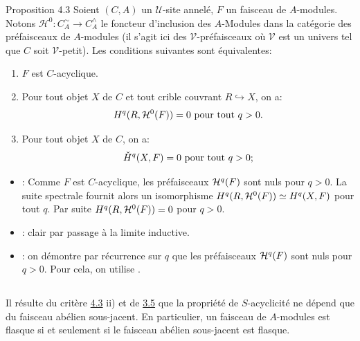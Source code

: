 \documentclass[10pt]{../fichiers-configuration-latex/smfart}
\begin{document}
\begin{enonce*}{Proposition 4.3}
Soient $(C, A)$ un $𝒰$-site annelé, $F$ un faisceau de
$A$-modules. Notons $\mathcal{H}^{0} :
C^{\sim}_{A} \to C^{\wedge}_{A}$
le foncteur d'inclusion des $A$-Modules dans la catégorie des
préfaisceaux de $A$-modules (il s'agit ici des
$𝒱$-préfaisceaux où $𝒱$ est un univers tel que
$C$ soit $𝒱$-petit). Les conditions suivantes sont
équivalentes:
\begin{enumerate}
\renewcommand{\theenumi}{\roman{enumi}}
\renewcommand{\labelenumi}{\theenumi)}
\item $F$ \pageoriginale est $C$-acyclique.

\item Pour tout objet $X$ de $C$ et tout crible couvrant $R
  \hookrightarrow X$, on a:
$$
H^q(R, {\mathcal H}^{0} (F)) = 0 \mbox{ pour tout } q > 0{}.
$$

\item Pour tout objet $X$ de $C$, on a:
$$
\check{H}^q (X, F) = 0 \mbox{ pour tout } q > 0{};
$$
\end{enumerate}
\end{enonce*}

\begin{itemize}
\item[i $\Rightarrow$ ii)]: Comme $F$ est $C$-acyclique, les préfaisceaux
${\mathcal H}^q(F)$ sont nuls pour $q > 0$. La suite spectrale 
fournit alors un isomorphisme $H^q (R, {\mathcal H}^{0} (F)) \simeq
H^q(X, F)$ pour tout $q$. Par suite $H^q(R, {\mathcal H}^{0} (F)) =
0$ pour $q > 0$.
\item[ii $\Rightarrow$ iii)]: clair par passage à la limite
  inductive.
\item[iii $\Rightarrow$ i)]: on démontre par récurrence sur $q$
  que les préfaisceaux ${\mathcal H}^q (F)$ sont nuls pour $q >
  0$. Pour cela, on utilise .
\end{itemize}


\setcounter{subsection}{3}
\subsection{}
Il résulte du critère \hyperref[V.prop4.3]{4.3} ii) et de \hyperref[V.cor3.5]{3.5} que la propriété de
$S$-acyclicité ne dépend que du faisceau abélien sous-jacent. En
particulier, un faisceau de $A$-modules est flasque si et seulement si
le faisceau abélien sous-jacent est flasque.
\end{document}

